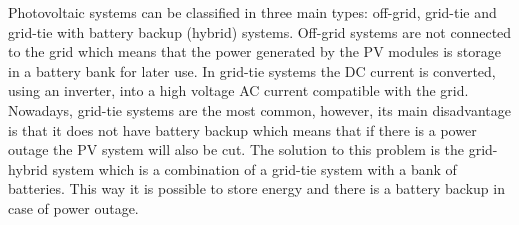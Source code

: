 Photovoltaic systems can be classified in three main types: off-grid, grid-tie and grid-tie with battery backup (hybrid) systems. Off-grid systems are not connected to the grid which means that the power generated by the PV modules is storage in a battery bank for later use. In grid-tie systems the DC current is converted, using an inverter, into a high voltage AC current compatible with the grid. Nowadays, grid-tie systems are the most common, however, its main disadvantage is that it does not have battery backup which means that if there is a power outage the PV system will also be cut.  The solution to this problem is the grid-hybrid system which is a combination of a grid-tie system with a bank of batteries. This way it is possible to store energy and there is a battery backup in case of power outage. %
